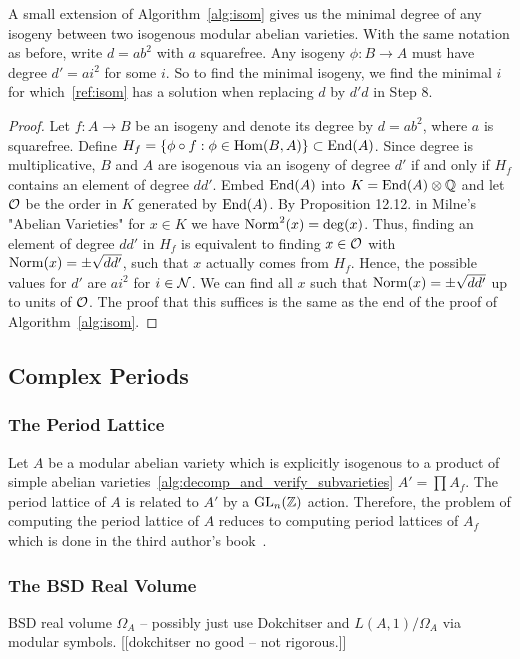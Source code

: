 \documentclass{article}
\begin{document}
A small extension of Algorithm~\ref{alg:isom} gives us the minimal degree of any
isogeny between two isogenous modular abelian varieties. With the same
notation as before, write $d=ab^2$ with $a$ squarefree. Any isogeny $\phi:B\to
A$ must have degree $d'=ai^2$ for some $i$. So to find the minimal isogeny, we
find the minimal $i$ for which~\ref{ref:isom} has a solution when replacing $d$
by $d'd$ in Step 8. 
\begin{proof}
    Let $f:A \to B$ be an isogeny and denote its degree by $d = ab^2$, where $a$ is
    squarefree. Define $H_f = \{\phi \circ f: \phi \in
    \operatorname{Hom}(B,A)\} \subset \operatorname{End}(A)$. Since degree is multiplicative, $B$ and $A$ are
    isogenous via an isogeny of degree $d'$ if and only if $H_f$ contains an element
    of degree $d d'$. Embed
    $\operatorname{End}(A)$ into $K = \operatorname{End}(A) \otimes \mathbb{Q}$ and let $\mathcal{O}$ be the order in $K$
    generated by $\operatorname{End}(A)$. By Proposition 12.12. in Milne's "Abelian Varieties"
    for $x \in K$ we have $\operatorname{Norm}^2(x) = \deg(x)$. Thus, finding an element of
    degree $dd'$ in $H_f$ is equivalent to finding $x \in \mathcal{O}$ with $\operatorname{Norm}(x) =
    \pm \sqrt{dd'}$, such that $x$ actually comes from $H_f$. Hence, the possible
    values for $d'$ are $a i^2$ for $i \in \mathcal{N}$. We can find all $x$
    such that $\operatorname{Norm}(x) = \pm \sqrt{dd'}$ up to units of $\mathcal{O}$.
    The proof that this suffices is the same as the end of the
    proof of Algorithm~\ref{alg:isom}.
\end{proof}


\subsection{Complex Periods}


\subsubsection{The Period Lattice}

Let $A$ be a modular abelian variety which is explicitly isogenous to a product
of simple abelian varieties~\ref{alg:decomp_and_verify_subvarieties} $A'=\prod
A_f$. The period lattice of $A$ is related to $A'$ by a $\operatorname{GL}_n(\mathbb{Z})$ action.
Therefore, the problem of computing the period lattice of $A$ reduces to
computing period lattices of $A_f$ which is done in the third author's
book~\cite[\S 10.6]{stein:modform}.


\subsubsection{The BSD Real Volume}
BSD real volume $\Omega_A$ -- possibly just use Dokchitser and
$L(A,1)/\Omega_A$ via modular symbols.  [[dokchitser no good -- not rigorous.]]
\end{document}
